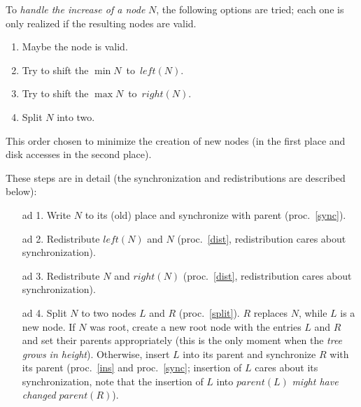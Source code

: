 \documentclass{vldb}
\begin{document}
\begin{proc} \label{inc}
To {\em handle the increase of a node} $N$, the following options are tried;
each one is only realized if the resulting nodes are valid.
\begin{enumerate}
\item Maybe the node is valid.
\item Try to shift the \mbox{$\min N$ to $left(N)$}.
\item Try to shift the \mbox{$\max N$ to $right(N)$}.
\item Split $N$ into two.
\end{enumerate}
This order chosen to minimize the creation of new nodes (in the first place and
disk accesses in the second place).

These steps are in detail (the synchronization and redistributions are 
described below):
\begin{enumerate}
\item[ad 1.] Write $N$ to its (old) place and synchronize with parent
    (proc.~\ref{sync}).
\item[ad 2.] Redistribute $left(N)$ and $N$ (proc.~\ref{dist},
    redistribution cares about synchronization).
\item[ad 3.] Redistribute $N$ and $right(N)$ (proc.~\ref{dist},
    redistribution cares about synchronization).
\item[ad 4.] Split $N$ to two nodes $L$ and $R$ (proc.~\ref{split}).
    $R$ replaces $N$, while $L$ is a new node.
    If $N$ was root, create a new root node with the entries $L$ and $R$ and
    set their parents appropriately (this is the only moment when the
    {\em tree grows in height}).
    Otherwise, insert $L$ into its parent and synchronize $R$ with its parent
    (proc.~\ref{ins} and proc.~\ref{sync}; insertion of $L$ cares about its
    synchronization, note that the insertion of $L$ into $parent(L)$
    {\em might have changed} $parent(R)$).
\end{enumerate}
\end{proc}
\end{document}
